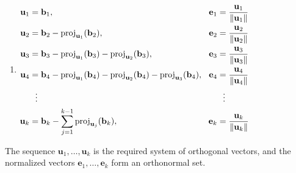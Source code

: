 \begin{enumerate}
\begin{enumerate}
        \item ${
        \displaystyle 
        {\begin{aligned}
            \mathbf {u} _{1} &=\mathbf {b} _{1}, &\!\mathbf {e} _{1}&={\frac {\mathbf {u} _{1}}{\|\mathbf {u} _{1}\|}}
            \\\mathbf {u} _{2}&=\mathbf {b} _{2}-\operatorname {proj} _{\mathbf {u} _{1}}(\mathbf {b} _{2}),&\!\mathbf {e} _{2}&={\frac {\mathbf {u} _{2}}{\|\mathbf {u} _{2}\|}}
            \\\mathbf {u} _{3}&=\mathbf {b} _{3}-\operatorname {proj} _{\mathbf {u} _{1}}(\mathbf {b} _{3})-\operatorname {proj} _{\mathbf {u} _{2}}(\mathbf {b} _{3}),&\!\mathbf {e} _{3}&={\frac {\mathbf {u} _{3}}{\|\mathbf {u} _{3}\|}}
            \\\mathbf {u} _{4}&=\mathbf {b} _{4}-\operatorname {proj} _{\mathbf {u} _{1}}(\mathbf {b} _{4})-\operatorname {proj} _{\mathbf {u} _{2}}(\mathbf {b} _{4})-\operatorname {proj} _{\mathbf {u} _{3}}(\mathbf {b} _{4}),&\!\mathbf {e} _{4}&={\mathbf {u} _{4} \over \|\mathbf {u} _{4}\|}
            \\&{}\ \ \vdots &&{}\ \ \vdots 
            \\\mathbf {u} _{k}&=\mathbf {b} _{k}-\sum _{j=1}^{k-1}\operatorname {proj} _{\mathbf {u} _{j}}(\mathbf {b} _{k}),&\!\mathbf {e} _{k}&={\frac {\mathbf {u} _{k}}{\|\mathbf {u} _{k}\|}}
        \end{aligned}}
        }$
        \hfill \cite{mfml/wiki/Gram-Schmidt_process}
    \end{enumerate}
    The sequence ${\displaystyle \mathbf {u} _{1},\ldots ,\mathbf {u} _{k}}$ is the required system of orthogonal vectors, and the normalized vectors ${\displaystyle \mathbf {e} _{1},\ldots ,\mathbf {e} _{k}}$ form an orthonormal set. 
    \hfill \cite{mfml/wiki/Gram-Schmidt_process}
\end{enumerate}



